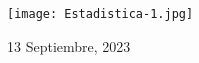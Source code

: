 \begin{center}
\begin{minipage}{0.46\textwidth}
\begin{flushright}
        \end{flushright}																	
    \end{minipage}	
    \vspace*{1cm}
    \vspace{2cm}
    \begin{center}						
    \texttt{[image: Estadistica-1.jpg]}
    \end{center}  	
        \begin{center}						
        {\large 13 Septiembre, 2023}
    \end{center}  
\end{center}	
\textbf{}